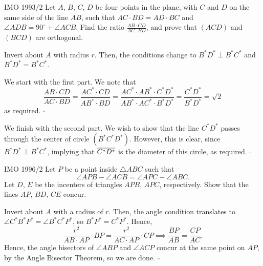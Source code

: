 \documentclass{article}
\begin{document}
\begin{problem}[8.34]{IMO 1993/2}
Let $A$, $B$, $C$, $D$ be four points in the plane, with $C$ and $D$ on the same side of the line $AB$, such that $AC \cdot BD = AD \cdot BC$ and $\angle ADB = 90^\circ + \angle ACB$. Find the ratio $\tfrac{AB\cdot CD}{AC \cdot BD}$, and prove that $(ACD)$ and $(BCD)$ are orthogonal.
\end{problem}
Invert about $A$ with radius $r$. Then, the conditions change to $B^*D^*\perp B^*C^*$ and $B^*D^* = B^*C^*$.

We start with the first part. We note that \[\dfrac{AB\cdot CD}{AC \cdot BD} = \dfrac{AC^* \cdot CD}{AB^* \cdot BD} = \dfrac{AC^* \cdot AB^* \cdot C^*D^*}{AB^* \cdot AC^*\cdot B^*D^*} = \dfrac{C^*D^*}{B^*D^*} = \sqrt{2}\] as required. $\square$

We finish with the second part. We wish to show that the line $C^*D^*$ passes through the center of circle $(B^*C^*D^*)$. However, this is clear, since $B^*D^*\perp B^*C^*$, implying that $\overline{C^*D^*}$ is the diameter of this circle, as required. $\square$

\begin{problem}[8.35]{IMO 1996/2}
Let $P$ be a point inside $\triangle ABC$ such that \[\angle APB - \angle ACB = \angle APC - \angle ABC.\] Let $D$, $E$ be the incenters of triangles $APB$, $APC$, respectively. Show that the lines $AP$, $BD$, $CE$ concur.
\end{problem}
Invert about $A$ with a radius of $r$. Then, the angle condition translates to $\angle C^*B^*P^* = \angle B^*C^*P^*$, so $B^*P^* = C^*P^*$. Hence, \[\dfrac{r^2}{AB \cdot AP}\cdot BP = \dfrac{r^2}{AC \cdot AP}\cdot CP \implies \dfrac{BP}{AB} = \dfrac{CP}{AC}.\] Hence, the angle bisectors of $\angle ABP$ and $\angle ACP$ concur at the same point on $AP$, by the Angle Bisector Theorem, so we are done. $\square$
\end{document}
